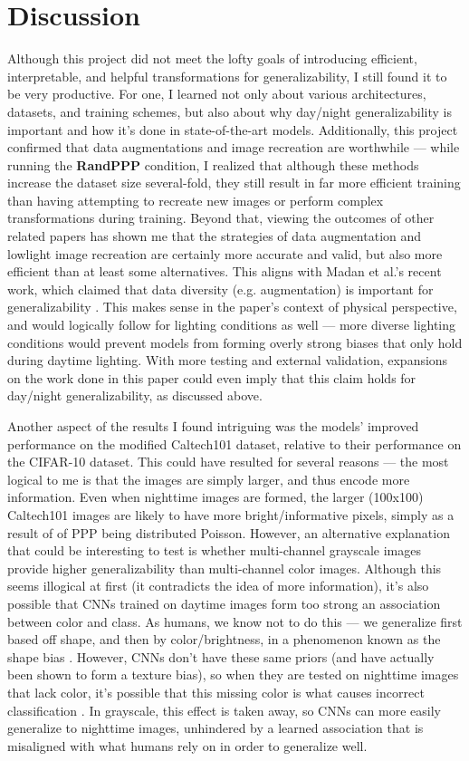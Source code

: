 \documentclass{article}
\begin{document}
\newpage
\section{Discussion}
Although this project did not meet the lofty goals of introducing efficient, interpretable, and helpful transformations for generalizability, I still found it to be very productive. For one, I learned not only about various architectures, datasets, and training schemes, but also about why day/night generalizability is important and how it's done in state-of-the-art models. Additionally, this project confirmed that data augmentations and image recreation are worthwhile --- while running the \textbf{RandPPP} condition, I realized that although these methods increase the dataset size several-fold, they still result in far more efficient training than having attempting to recreate new images or perform complex transformations during training. Beyond that, viewing the outcomes of other related papers has shown me that the strategies of data augmentation and lowlight image recreation are certainly more accurate and valid, but also more efficient than at least some alternatives. This aligns with Madan et al.'s recent work, which claimed that data diversity (e.g. augmentation) is important for generalizability \cite{madan2022}. This makes sense in the paper's context of physical perspective, and would logically follow for lighting conditions as well --- more diverse lighting conditions would prevent models from forming overly strong biases that only hold during daytime lighting. With more testing and external validation, expansions on the work done in this paper could even imply that this claim holds for day/night generalizability, as discussed above.

Another aspect of the results I found intriguing was the models' improved performance on the modified Caltech101 dataset, relative to their performance on the CIFAR-10 dataset. This could have resulted for several reasons --- the most logical to me is that the images are simply larger, and thus encode more information. Even when nighttime images are formed, the larger (100x100) Caltech101 images are likely to have more bright/informative pixels, simply as a result of of PPP being distributed Poisson. However, an alternative explanation that could be interesting to test is whether multi-channel grayscale images provide higher generalizability than multi-channel color images. Although this seems illogical at first (it contradicts the idea of more information), it's also possible that CNNs trained on daytime images form too strong an association between color and class. As humans, we know not to do this --- we generalize first based off shape, and then by color/brightness, in a phenomenon known as the shape bias \cite{landauShape}. However, CNNs don't have these same priors (and have actually been shown to form a texture bias),  so when they are tested on nighttime images that lack color, it's possible that this missing color is what causes incorrect classification \cite{textureBias}. In grayscale, this effect is taken away, so CNNs can more easily generalize to nighttime images, unhindered by a learned association that is misaligned with what humans rely on in order to generalize well.
\end{document}
